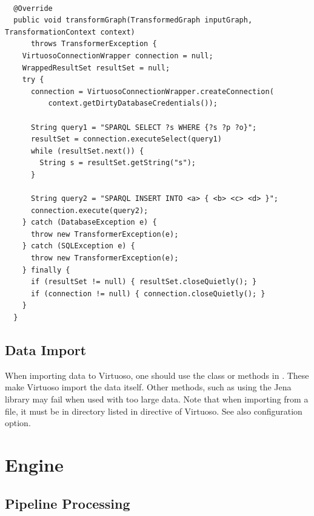 \begin{lstlisting}[caption={Example of programmatic access to Virtuoso database from a transformer},label=lst:virtuosoConnectionWrapper]

  @Override
  public void transformGraph(TransformedGraph inputGraph, TransformationContext context)
      throws TransformerException {
    VirtuosoConnectionWrapper connection = null;
    WrappedResultSet resultSet = null;
    try {
      connection = VirtuosoConnectionWrapper.createConnection(
          context.getDirtyDatabaseCredentials());

      String query1 = "SPARQL SELECT ?s WHERE {?s ?p ?o}";
      resultSet = connection.executeSelect(query1)
      while (resultSet.next()) {
        String s = resultSet.getString("s");
      }

      String query2 = "SPARQL INSERT INTO <a> { <b> <c> <d> }";
      connection.execute(query2);
    } catch (DatabaseException e) {
      throw new TransformerException(e);
    } catch (SQLException e) {
      throw new TransformerException(e);
    } finally {
      if (resultSet != null) { resultSet.closeQuietly(); }
      if (connection != null) { connection.closeQuietly(); }
    }
  }
\end{lstlisting}

\section{Data Import}
When importing data to Virtuoso, one should use the   class or methods in . These make Virtuoso import the data itself. Other methods, such as using the Jena library may fail when used with too large data. Note that when importing from a file, it must be in directory listed in  directive of Virtuoso. See also  configuration option.

\chapter{Engine}


\section{Pipeline Processing}

